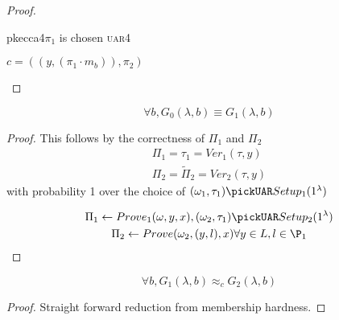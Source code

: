 \begin{proof}
\begin{cryptogame}{pkecca4}{$\pi_1$ is chosen \textsc{uar}}{4}
        \cseqdelay
    
        {$c = ((y, (\pi_1 \cdot m_b)), \pi_2)$}{}
    
        \cseqdelay
    
        \send{}{}{}
        \receive{}{}{}
    
        \cseqdelay
    
    
    \end{cryptogame}

\end{proof}


\begin{lemma}
    \[
        \forall b, G_{0}(\lambda, b) \equiv G_{1}(\lambda, b)   
    \]
\end{lemma}

\begin{proof}
    This follows by the correctness of $\Pi_{1}$ and $\Pi_{2}$
    \begin{gather*}
        \Pi_{1}=\tau_{1}=Ver_{1}(\tau, y)\\
         \Pi_{2}= \tilde{\Pi}_{2}=Ver_{2}(\tau, y)
    \end{gather*}
    with probability 1 over the choice of $(\omega_{1}, \tau_{1}) \pickUAR
    Setup_{1}(1^{\lambda})$
    
    \begin{gather*}
        \Pi_{1} \leftarrow Prove_{1}(\omega, y, x), (\omega_{2},
        \tau_{1})\pickUAR Setup_{2} (1^{\lambda})\\
        \Pi_{2} \leftarrow Prove(\omega_{2}, (y, l), x) \forall y \in L , l \in
        \P_{1}
    \end{gather*}
    
\end{proof}

\begin{lemma}
    \[
        \forall b, G_{1}(\lambda, b) \approx_{c} G_{2}(\lambda, b)   
    \]
\end{lemma}
\begin{proof}
    Straight forward reduction from membership hardness.
\end{proof}

